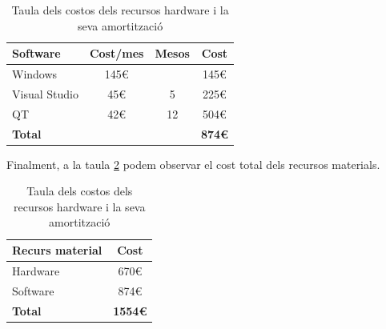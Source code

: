 \documentclass[a4paper]{article}
\begin{document}
\begin{table}[H]
    \begin{center}
        \begin{tabular}{|l|c|c|c|}
            \hline
            \rowcolor[HTML]{9B9B9B} 
            {\color[HTML]{000000} \textbf{Software}} & {\color[HTML]{000000} \textbf{Cost/mes}} & {\color[HTML]{000000} \textbf{Mesos}} & {\color[HTML]{000000} \textbf{Cost}} \\ \hline
            {\color[HTML]{000000} Windows}           & {\color[HTML]{000000} 145€}              & {\color[HTML]{000000} }               & {\color[HTML]{000000} 145€}          \\ \hline
            {\color[HTML]{000000} Visual Studio}     & {\color[HTML]{000000} 45€}               & {\color[HTML]{000000} 5}              & {\color[HTML]{000000} 225€}          \\ \hline
            {\color[HTML]{000000} QT}                & {\color[HTML]{000000} 42€}               & {\color[HTML]{000000} 12}             & {\color[HTML]{000000} 504€}          \\ \hline
            \rowcolor[HTML]{C0C0C0} 
            {\color[HTML]{000000} \textbf{Total}}    & {\color[HTML]{000000} \textbf{}}         & {\color[HTML]{000000} \textbf{}}      & {\color[HTML]{000000} \textbf{874€}} \\ \hline
        \end{tabular}
        \caption{Taula dels costos dels recursos hardware i la seva amortització}
        \label{tab:TaulaCostosSoftware}
    \end{center}
\end{table}

Finalment, a la taula \ref{tab:TaulaCostosMaterials} podem observar el cost total dels recursos materials.

\begin{table}[H]
    \begin{center}
        \begin{tabular}{|l|c|}
            \hline
            \rowcolor[HTML]{9B9B9B} 
            {\color[HTML]{000000} \textbf{Recurs material}} & {\color[HTML]{000000} \textbf{Cost}}  \\ \hline
            {\color[HTML]{000000} Hardware}                 & {\color[HTML]{000000} 670€}           \\ \hline
            {\color[HTML]{000000} Software}                 & {\color[HTML]{000000} 874€}           \\ \hline
            \rowcolor[HTML]{C0C0C0} 
            {\color[HTML]{000000} \textbf{Total}}           & {\color[HTML]{000000} \textbf{1554€}} \\ \hline
        \end{tabular}
        \caption{Taula dels costos dels recursos hardware i la seva amortització}
        \label{tab:TaulaCostosMaterials}
    \end{center}
\end{table}
\end{document}
